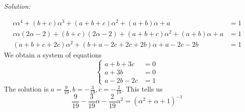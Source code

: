 \documentclass[a4paper, 12pt]{article}
\newenvironment{solution}
    {\textit{Solution:}}
    {}
\begin{document}
\begin{solution}
\begin{enumerate}[(1)]
\begin{align*}
	c\alpha^4+(b+c)\alpha^3+(a+b+c)\alpha^2+(a+b)\alpha+a&=1\\ 
	c\alpha(2\alpha-2)+(b+c)(2\alpha-2)+(a+b+c)\alpha^2+(a+b)\alpha+a&=1\\ 
	(a+b+c+2c)\alpha^2+(b+a-2c+2c+2b)\alpha+a-2c-2b&=1
\end{align*} 
We obtain a system of equations 
\[\begin{cases}
	a+b+3c&=0\\ 
	a+3b&=0\\ 
	a-2b-2c&=1
\end{cases}\]
The solution is \(a=\frac{9}{19},b=-\frac{3}{19},c=-\frac{2}{19}\). This tells us 
\[\frac{9}{19}-\frac{3}{19}\alpha-\frac{2}{19}\alpha^2=(\alpha^2+\alpha+1)^{-1}\]
\end{enumerate}
\end{solution}
\end{document}
